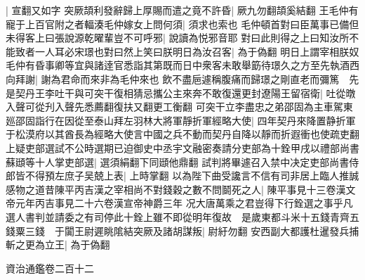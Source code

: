 |{
	宣翻又如字}
突厥頡利發辭歸上厚賜而遣之竟不許昏|{
	厥九勿翻頡奚結翻}
王毛仲有寵于上百官附之者輻湊毛仲嫁女上問何須|{
	須求也索也}
毛仲頓首對曰臣萬事已備但未得客上曰張說源乾曜輩豈不可呼邪|{
	說讀為悦邪音耶}
對曰此則得之上曰知汝所不能致者一人耳必宋璟也對曰然上笑曰朕明日為汝召客|{
	為于偽翻}
明日上謂宰相朕奴毛仲有昏事卿等宜與諸逹官悉詣其第既而日中衆客未敢舉筯待璟久之方至先執酒西向拜謝|{
	謝為君命而來非為毛仲來也}
飲不盡巵遽稱腹痛而歸璟之剛直老而彌篤　先是契丹王李吐干與可突干復相猜忌攜公主來奔不敢復還更封遼陽王留宿衛|{
	吐從暾入聲可從刋入聲先悉薦翻復扶又翻更工衡翻}
可突干立李盡忠之弟邵固為主車駕東廵邵固詣行在因從至泰山拜左羽林大將軍靜折軍經略大使|{
	四年契丹來降置静折軍于松漠府以其酋長為經略大使言中國之兵不動而契丹自降以靜而折遐衝也使疏吏翻}
上疑吏部選試不公時選期已迫御史中丞宇文融密奏請分吏部為十銓甲戌以禮部尚書蘇頲等十人掌吏部選|{
	選須絹翻下同頲他鼎翻}
試判將畢遽召入禁中决定吏部尚書侍郎皆不得預左庶子吴兢上表|{
	上時掌翻}
以為陛下曲受讒言不信有司非居上臨人推誠感物之道昔陳平丙吉漢之宰相尚不對錢穀之數不問鬬死之人|{
	陳平事見十三卷漢文帝元年丙吉事見二十六卷漢宣帝神爵三年}
况大唐萬乘之君豈得下行銓選之事乎凡選人書判並請委之有司停此十銓上雖不即從明年復故　是歲東都斗米十五錢青齊五錢粟三錢　于闐王尉遲眺隂結突厥及諸胡謀叛|{
	尉紆勿翻}
安西副大都護杜暹發兵捕斬之更為立王|{
	為于偽翻}


資治通鑑卷二百十二
